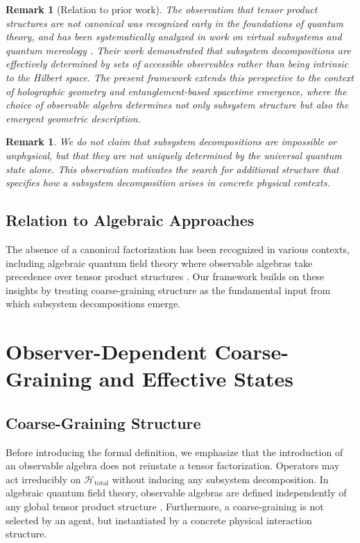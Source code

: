 \documentclass[12pt,a4paper,openany]{book}
\newtheorem{remark}[theorem]{Remark}
\begin{document}
\begin{remark}[Relation to prior work]
The observation that tensor product structures are not canonical was recognized early in the foundations of quantum theory, and has been systematically analyzed in work on virtual subsystems and quantum mereology \cite{Zanardi2001,Zanardi2004,Cotler2019,CarrollSingh2021}.
Their work demonstrated that subsystem decompositions are effectively determined by sets of accessible observables rather than being intrinsic to the Hilbert space.
The present framework extends this perspective to the context of holographic geometry and entanglement-based spacetime emergence, where the choice of observable algebra determines not only subsystem structure but also the emergent geometric description.
\end{remark}

\begin{remark}
We do not claim that subsystem decompositions are impossible or unphysical, but that they are not uniquely determined by the universal quantum state alone. 
This observation motivates the search for additional structure that specifies how a subsystem decomposition arises in concrete physical contexts.
\end{remark}

\subsection{Relation to Algebraic Approaches}

The absence of a canonical factorization has been recognized in various contexts, including algebraic quantum field theory where observable algebras take precedence over tensor product structures \cite{Haag1996}.
Our framework builds on these insights by treating coarse-graining structure as the fundamental input from which subsystem decompositions emerge.

\section{Observer-Dependent Coarse-Graining and Effective States}
\label{A-sec:coarse}

\subsection{Coarse-Graining Structure}

Before introducing the formal definition, we emphasize that the introduction of an observable algebra does not reinstate a tensor factorization. 
Operators may act irreducibly on $\mathcal{H}_{\text{total}}$ without inducing any subsystem decomposition. 
In algebraic quantum field theory, observable algebras are defined independently of any global tensor product structure \cite{Haag1996}.
Furthermore, a coarse-graining is not selected by an agent, but instantiated by a concrete physical interaction structure.
\end{document}
